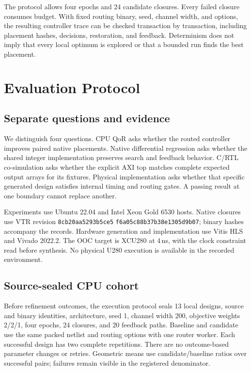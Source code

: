 \documentclass[conference,10pt]{IEEEtran}
\begin{document}
The protocol allows four epochs and 24 candidate closures. Every failed
closure consumes budget. With fixed routing binary, seed, channel width,
and options, the resulting controller trace can be checked transaction by
transaction, including placement hashes, decisions, restoration, and feedback.
Determinism does not imply that every local optimum is explored or that a
bounded run finds the best placement.



\section{Evaluation Protocol}

\subsection{Separate questions and evidence}

We distinguish four questions. CPU QoR asks whether the routed controller
improves paired native placements. Native differential regression asks whether
the shared integer implementation preserves search and feedback behavior.
C/RTL co-simulation asks whether the explicit AXI top matches complete
expected output arrays for its fixtures. Physical implementation asks whether
that specific generated design satisfies internal timing and routing gates.
A passing result at one boundary cannot replace another.

Experiments use Ubuntu 22.04 and Intel Xeon Gold 6530 hosts. Native closures
use VTR revision \texttt{8cb20aa5293b5ce5}\allowbreak
\texttt{f6a05c88b37b38e1305d9b07}; binary hashes accompany the records.
Hardware generation and implementation use Vitis HLS and Vivado 2022.2.
The OOC target is XCU280 at 4\,ns, with the clock constraint read before
synthesis. No physical U280 execution is available in the recorded environment.

\subsection{Source-sealed CPU cohort}

Before refinement outcomes, the execution protocol seals 13 local designs,
source and binary identities, architecture, seed 1, channel width 200,
objective weights 2/2/1, four epochs, 24 closures, and 20 feedback paths.
Baseline and candidate use the same packed netlist and routing options with
one router worker. Each successful design has two complete repetitions.
There are no outcome-based parameter changes or retries. Geometric means
use candidate/baseline ratios over successful pairs; failures remain visible
in the registered denominator.
\end{document}
